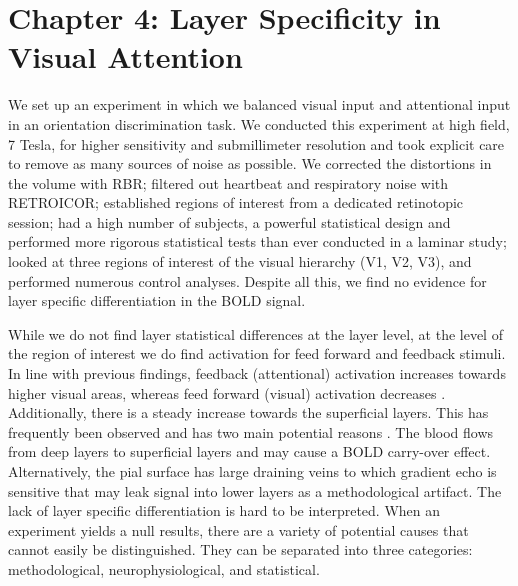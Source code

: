 \section*{Chapter 4: Layer Specificity in Visual Attention}
We set up an experiment in which we balanced visual input and attentional input in an orientation discrimination task. We conducted this experiment at high field, 7 Tesla, for higher sensitivity and submillimeter resolution and took explicit care to remove as many sources of noise as possible. We corrected the distortions in the volume with RBR; filtered out heartbeat and respiratory noise with RETROICOR; established regions of interest from a dedicated retinotopic session; had a high number of subjects, a powerful statistical design and performed more rigorous statistical tests than ever conducted in a laminar study; looked at three regions of interest of the visual hierarchy (V1, V2, V3), and performed numerous control analyses. Despite all this, we find no evidence for layer specific differentiation in the BOLD signal.

While we do not find layer statistical differences at the layer level, at the level of the region of interest we do find activation for feed forward and feedback stimuli. In line with previous findings, feedback (attentional) activation increases towards higher visual areas, whereas feed forward (visual) activation decreases \cite{Murray2008,Jehee2011}. Additionally, there is a steady increase towards the superficial layers. This has frequently been observed and has two main potential reasons \cite{Koopmans2010,Polimeni2010}. The blood flows from deep layers to superficial layers and may cause a BOLD carry-over effect. Alternatively, the pial surface has large draining veins to which gradient echo is sensitive that may leak signal into lower layers as a methodological artifact. The lack of layer specific differentiation is hard to be interpreted. When an experiment yields a null results, there are a variety of potential causes that cannot easily be distinguished. They can be separated into three categories: methodological, neurophysiological, and statistical.

